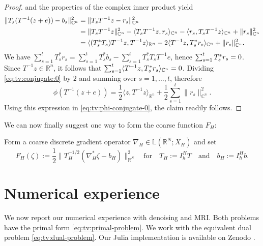 \documentclass[a4paper,english]{jnsao}
\theoremstyle{definition}
\numberwithin{algorithm}{section}
\newcommand{\nr}[2]{ \| #1 \|_{#2}}
\newcommand{\pd}[2]{ \langle #1,#2 \rangle}
\def\grad{\nabla}
\def\linear{\mathbb{L}}
\def\iprod#1#2{\langle #1, #2 \rangle}
\def\defeq{:=}
\def\R{\mathbb{R}}
\def\C{\mathbb{C}}
\let\Re\relax\DeclareMathOperator{\Re}{Re}
\begin{document}
\begin{proof}
     and the properties of the complex inner product yield
    \begin{equation}
        \label{eq:tv:conjugate:0}
        \begin{aligned}[t]
        \nr{T_s(T^{-1}(z+e))-b_s}{\C^n}^2
        &
        = \nr{T_sT^{-1}z - r_s}{\C^n}^2
        \\
        &
        = \nr{T_sT^{-1}z}{\C^n}^2 - \pd{T_s T^{-1}z}{r_s}_{\mathbb{C}^n} - \pd{r_s}{T_s T^{-1}z}_{\mathbb{C}^n} +\nr{r_s}{\C^n}^2
        \\
        &
        = \iprod{\Re(T_s^*T_s) T^{-1}z}{T^{-1}z}_{\R^n}
        - 2 \Re \pd{T^{-1}z}{T_s^* r_s}_{\mathbb{C}^n}
        + \nr{r_s}{\C^n}^2.
        \end{aligned}
    \end{equation}
    We have $\sum_{s=1}^t T_s^*r_s=\sum_{s=1}^t T_s^* b_s - \sum_{s=1}^t T_s^*T_s T^{-1} e$, hence $\Re \sum_{s=1}^t T_s^*r_s= 0$.
    Since $T^{-1}z \in \R^n$, it follows that $\sum _{s=1}^t\Re \pd{T^{-1}z}{T_s^* r_s}_{\mathbb{C}^n} = 0$.
    Dividing \eqref{eq:tv:conjugate:0} by $2$ and summing over $s=1,\ldots,t$, therefore
    \[
        \phi(T^{-1}(z+e))
        = \frac{1}{2}\pd{z}{T^{-1}z}_{\R^n} + \frac{1}{2}\sum _{s=1}^t\nr{r_s}{\C^n}^2.
    \]
    Using this expression in \eqref{eq:tv:phi-conjugate-0}, the claim readily follows.
\end{proof}

We can now finally suggest one way to form the coarse function $F_H$:

\begin{example}
    \label{ex:coarse:FH}
    Form a coarse discrete gradient operator $\grad_H \in \linear(\R^N; X_H)$ and set
    \[
        F_H(\zeta ) \defeq \frac{1}{2} \nr{T_H^{-1/2}(\grad _H ^*\zeta - b_H)}{\R^N}^2
        \quad\text{for}\quad
        T_H \defeq I_h^H T
        \quad\text{and}\quad
        b_H \defeq I_h^H b.
    \]
\end{example}

\section{Numerical experience}
\label{sec:numerical}

We now report our numerical experience with denoising and MRI.
Both problems have the primal form \eqref{eq:tv:primal-problem}.
We work with the equivalent dual problem \eqref{eq:tv:dual-problem}.
Our Julia implementation is available on Zenodo \cite{multigrid-codes-zenodo}.
\end{document}
